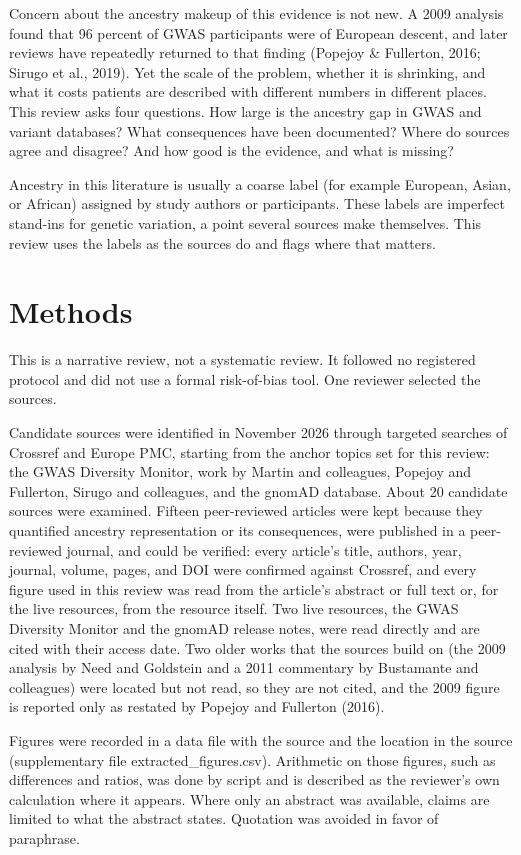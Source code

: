 \documentclass[12pt]{article}
\begin{document}
Concern about the ancestry makeup of this evidence is not new. A 2009 analysis found that 96 percent of GWAS participants were of European descent, and later reviews have repeatedly returned to that finding (Popejoy \& Fullerton, 2016; Sirugo et al., 2019). Yet the scale of the problem, whether it is shrinking, and what it costs patients are described with different numbers in different places. This review asks four questions. How large is the ancestry gap in GWAS and variant databases? What consequences have been documented? Where do sources agree and disagree? And how good is the evidence, and what is missing?

Ancestry in this literature is usually a coarse label (for example European, Asian, or African) assigned by study authors or participants. These labels are imperfect stand-ins for genetic variation, a point several sources make themselves. This review uses the labels as the sources do and flags where that matters.

\section*{Methods}
This is a narrative review, not a systematic review. It followed no registered protocol and did not use a formal risk-of-bias tool. One reviewer selected the sources.

Candidate sources were identified in November 2026 through targeted searches of Crossref and Europe PMC, starting from the anchor topics set for this review: the GWAS Diversity Monitor, work by Martin and colleagues, Popejoy and Fullerton, Sirugo and colleagues, and the gnomAD database. About 20 candidate sources were examined. Fifteen peer-reviewed articles were kept because they quantified ancestry representation or its consequences, were published in a peer-reviewed journal, and could be verified: every article's title, authors, year, journal, volume, pages, and DOI were confirmed against Crossref, and every figure used in this review was read from the article's abstract or full text or, for the live resources, from the resource itself. Two live resources, the GWAS Diversity Monitor and the gnomAD release notes, were read directly and are cited with their access date. Two older works that the sources build on (the 2009 analysis by Need and Goldstein and a 2011 commentary by Bustamante and colleagues) were located but not read, so they are not cited, and the 2009 figure is reported only as restated by Popejoy and Fullerton (2016).

Figures were recorded in a data file with the source and the location in the source (supplementary file extracted\_figures.csv). Arithmetic on those figures, such as differences and ratios, was done by script and is described as the reviewer's own calculation where it appears. Where only an abstract was available, claims are limited to what the abstract states. Quotation was avoided in favor of paraphrase.
\end{document}
